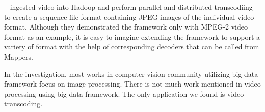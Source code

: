 \citeauthor{2013_Pivotal}~\cite{2013_Pivotal} ingested video into Hadoop and
perform parallel and distributed transcodiing to create a sequence file format
containing JPEG images of the individual video format. Although they
demonstrated the framework only with MPEG-2 video format as an example, it is
easy to imagine extending the framework to support a variety of format with the
help of corresponding decoders that can be called from Mappers. 

In the investigation, most works in computer vision community utilizing big data
framework focus on image processing. There is not much work mentioned in video
processing using big data framework. The only application we found is video
transcoding. 

 